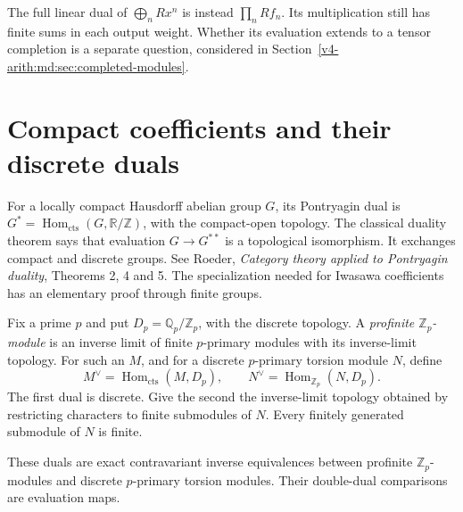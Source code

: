 The full linear dual of $\bigoplus_nRx^n$ is instead
$\prod_nRf_n$. Its multiplication still has finite sums in each
output weight. Whether its evaluation extends to a tensor completion
is a separate question, considered in
Section~\ref{v4-arith:md:sec:completed-modules}.

\section{Compact coefficients and their discrete duals}
\label{v4-arith:md:sec:compact}

For a locally compact Hausdorff abelian group $G$, its Pontryagin dual
is $G^*=\operatorname{Hom}_{\mathrm{cts}}(G,\mathbb R/\mathbb Z)$,
with the compact-open topology. The classical duality theorem says
that evaluation $G\to G^{**}$ is a topological isomorphism. It
exchanges compact and discrete groups. See Roeder,
\emph{Category theory applied to Pontryagin duality}, Theorems 2, 4
and 5. The specialization needed for Iwasawa coefficients has an
elementary proof through finite groups.

Fix a prime $p$ and put $D_p=\mathbb Q_p/\mathbb Z_p$, with the
discrete topology. A \emph{profinite $\mathbb Z_p$-module} is an
inverse limit of finite $p$-primary modules with its inverse-limit
topology. For such an $M$, and for a discrete $p$-primary torsion
module $N$, define
\[
 M^\vee=\operatorname{Hom}_{\mathrm{cts}}(M,D_p),\qquad
 N^\vee=\operatorname{Hom}_{\mathbb Z_p}(N,D_p).
\]
The first dual is discrete. Give the second the inverse-limit
topology obtained by restricting characters to finite submodules
of $N$. Every finitely generated submodule of $N$ is finite.

\begin{theorem}
\label{v4-arith:md:thm:pontryagin}
These duals are exact contravariant inverse equivalences between
profinite $\mathbb Z_p$-modules and discrete $p$-primary torsion
modules. Their double-dual comparisons are evaluation maps.
\end{theorem}

